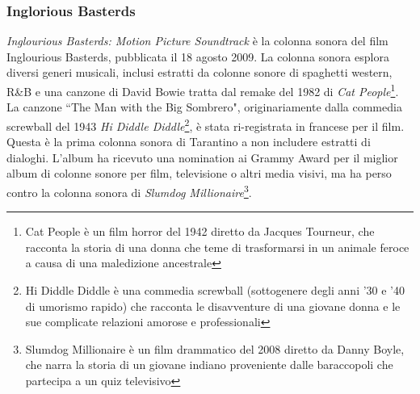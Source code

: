 \documentclass[12pt]{article} %
\begin{document}
                \subsubsection*{Inglorious Basterds}
                \begin{flushleft}
                    \textit{Inglourious Basterds: Motion Picture Soundtrack} è la colonna sonora del film Inglourious Basterds, pubblicata il 18 agosto 2009. La colonna sonora esplora diversi generi musicali, inclusi estratti da colonne sonore di spaghetti western, R\&B e una canzone di David Bowie tratta dal remake del 1982 di \textit{Cat People}\footnote{Cat People è un film horror del 1942 diretto da Jacques Tourneur, che racconta la storia di una donna che teme di trasformarsi in un animale feroce a causa di una maledizione ancestrale}. La canzone ``The Man with the Big Sombrero", originariamente dalla commedia screwball del 1943 \textit{Hi Diddle Diddle}\footnote{Hi Diddle Diddle è una commedia screwball (sottogenere degli anni '30 e '40 di umorismo rapido) che racconta le disavventure di una giovane donna e le sue complicate relazioni amorose e professionali}, è stata ri-registrata in francese per il film. Questa è la prima colonna sonora di Tarantino a non includere estratti di dialoghi. L'album ha ricevuto una nomination ai Grammy Award per il miglior album di colonne sonore per film, televisione o altri media visivi, ma ha perso contro la colonna sonora di \textit{Slumdog Millionaire}\footnote{Slumdog Millionaire è un film drammatico del 2008 diretto da Danny Boyle, che narra la storia di un giovane indiano proveniente dalle baraccopoli che partecipa a un quiz televisivo}.
                \end{flushleft}
                    \small
\end{document}
